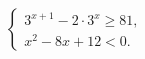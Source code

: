 \begin{ex}[type=ineq_system]
	\begin{condition}
	\( \left\{
	\begin{array}{l}
		3^{x+1}-2\cdot3^x\ge81,\\
		x^2-8x+12<0.
	\end{array}
	\right. \)
	\end{condition}
	\answer{\( [4;6) \)}
\end{ex}